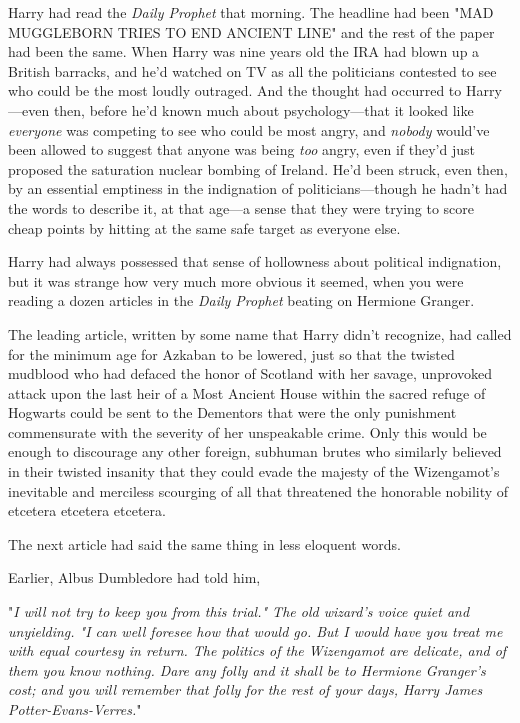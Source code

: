 Harry had read the \emph{Daily Prophet} that morning. The headline had been 
"MAD MUGGLEBORN TRIES TO END ANCIENT LINE" and the rest of the paper had been 
the same. When Harry was nine years old the IRA had blown up a British 
barracks, and he'd watched on TV as all the politicians contested to see who 
could be the most loudly outraged. And the thought had occurred to Harry---even 
then, before he'd known much about psychology---that it looked like 
\emph{everyone} was competing to see who could be most angry, and \emph{nobody} 
would've been allowed to suggest that anyone was being \emph{too} angry, even 
if they'd just proposed the saturation nuclear bombing of Ireland. He'd been 
struck, even then, by an essential emptiness in the indignation of 
politicians---though he hadn't had the words to describe it, at that age---a 
sense that they were trying to score cheap points by hitting at the same safe 
target as everyone else.

Harry had always possessed that sense of hollowness about political 
indignation, but it was strange how very much more obvious it seemed, when you 
were reading a dozen articles in the \emph{Daily Prophet} beating on Hermione 
Granger.

The leading article, written by some name that Harry didn't recognize, had 
called for the minimum age for Azkaban to be lowered, just so that the twisted 
mudblood who had defaced the honor of Scotland with her savage, unprovoked 
attack upon the last heir of a Most Ancient House within the sacred refuge of 
Hogwarts could be sent to the Dementors that were the only punishment 
commensurate with the severity of her unspeakable crime. Only this would be 
enough to discourage any other foreign, subhuman brutes who similarly believed 
in their twisted insanity that they could evade the majesty of the Wizengamot's 
inevitable and merciless scourging of all that threatened the honorable 
nobility of etcetera etcetera etcetera.

The next article had said the same thing in less eloquent words.

Earlier, Albus Dumbledore had told him,

"\emph{I will not try to keep you from this trial." The old wizard's voice 
quiet and unyielding. "I can well foresee how that would go. But I would have 
you treat me with equal courtesy in return. The politics of the Wizengamot are 
delicate, and of them you know nothing. Dare any folly and it shall be to 
Hermione Granger's cost; and you will remember that folly for the rest of your 
days, Harry James Potter-Evans-Verres.}"

